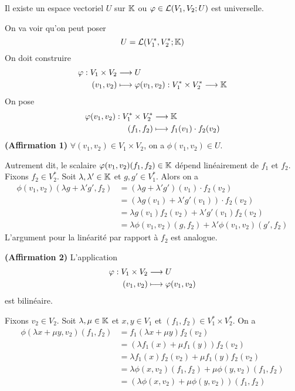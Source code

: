 \begin{theoreme}
  Il existe un espace vectoriel $U$ sur $\mathbb{K}$ ou $\varphi \in \mathcal{L}(V_1, V_2; U)$ est universelle.

  \tcblower
  \begin{preuve}
    On va voir qu'on peut poser
    $$U = \mathcal{L}(V_1^*, V_2^*; \mathbb{K})$$
    On doit construire
    \begin{align*}
      \varphi: V_1 \times V_2 &\longrightarrow U \\
      (v_1, v_2) &\longmapsto \varphi(v_1, v_2) : V_1^* \times V_2^* \longrightarrow \mathbb{K}
    \end{align*}
    On pose
    \begin{align*}
      \varphi(v_1, v_2): V_1^* \times V_2^* &\longrightarrow \mathbb{K} \\
      (f_1, f_2) &\longmapsto f_1(v_1) \cdot f_2(v_2)
    \end{align*}
    \textbf{(Affirmation 1)} $\forall (v_1,v_2) \in V_1 \times V_2$, on a $\phi(v_1, v_2) \in U$.
    \par Autrement dit, le scalaire $\varphi(v_1, v_2)(f_1, f_2) \in \mathbb{K}$ dépend linéairement de $f_1$ et $f_2$. Fixons $f_2 \in V_2^*$. Soit $\lambda, \lambda' \in \mathbb{K}$ et $g, g' \in V_1^*$. Alors on a
    \begin{align*}
      \phi(v_1,v_2)(\lambda g + \lambda' g', f_2) &= (\lambda g + \lambda' g')(v_1)\cdot f_2(v_2) \\
                                                  &= (\lambda g(v_1) + \lambda' g'(v_1)) \cdot f_2(v_2) \\
                                                  &= \lambda g(v_1)f_2(v_2) + \lambda' g'(v_1)f_2(v_2) \\
                                                  &= \lambda \phi(v_1,v_2)(g, f_2) + \lambda' \phi(v_1, v_2)(g', f_2)
    \end{align*}
    L'argument pour la linéarité par rapport à $f_2$ est analogue.
    \par \textbf{(Affirmation 2)} L'application
    \begin{align*}
      \varphi: V_1 \times V_2 &\longrightarrow U \\
      (v_1, v_2) &\longmapsto \varphi(v_1, v_2)
    \end{align*}
    est bilinéaire.
    \par Fixons $v_2 \in V_2$. Soit $\lambda, \mu \in \mathbb{K}$ et $x, y \in V_1$ et $(f_1, f_2) \in V_1^* \times V_2^*$. On a
    \begin{align*}
      \phi(\lambda x + \mu y, v_2)(f_1, f_2) &= f_1(\lambda x + \mu y) f_2(v_2) \\
                                             &= (\lambda f_1(x) + \mu f_1(y)) f_2(v_2) \\
                                             &= \lambda f_1(x)f_2(v_2) + \mu f_1(y)f_2(v_2) \\
                                             &= \lambda \phi(x, v_2)(f_1, f_2) + \mu \phi(y, v_2)(f_1,f_2) \\
                                             &= \left( \lambda\phi(x,v_2) + \mu\phi(y, v_2) \right)(f_1,f_2)
    \end{align*}


\end{preuve}
\end{theoreme}
